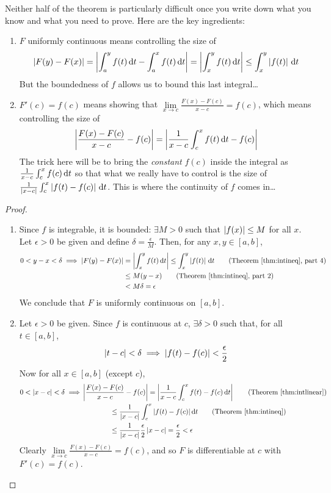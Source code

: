  Neither half of the theorem is particularly difficult once you write down what you know and what you need to prove. Here are the key ingredients:
\begin{enumerate}
  \item $F$ uniformly continuous means controlling the size of
  \[\left| F(y)-F(x)\right|=\left| \int_a^yf(t)\,{\mathrm{d} t}-\int_a^xf(t)\,{\mathrm{d} t}\right|=\left| \int_x^yf(t)\,{\mathrm{d} t}\right|\le \int_x^y\left| f(t)\right|\,{\mathrm{d} t}\]
  But the boundedness of $f$ allows us to bound this last integral\ldots
  \item $F'(c)=f(c)$ means showing that $\lim\limits_{x\to c}\frac{F(x)-F(c)}{x-c}=f(c)$, which means controlling the size of
  \[\left| \frac{F(x)-F(c)}{x-c}-f(c)\right| =\left| \frac 1{x-c}\int_{c}^xf(t)\,{\mathrm{d} t}-f(c)\right|\]
  The trick here will be to bring the \emph{constant} $f(c)$ inside the integral as $\frac 1{x-c}\int_c^xf(c)\,{\mathrm{d} t}$ so that what we really have to control is the size of $\frac 1{\left| x-c\right|}\int_c^x\left| f(t)-f(c)\right|\,{\mathrm{d} t}$. This is where the continuity of $f$ comes in\ldots
\end{enumerate}

\begin{proof}%
\begin{enumerate}
  \item Since $f$ is integrable, it is bounded: $\exists M>0$ such that $\left| f(x)\right|\le M$ for all $x$.\smallbreak
	Let $\epsilon>0$ be given and define $\delta=\frac{\epsilon}M$. Then, for any $x,y\in[a,b]$,
	\begin{align*}
		0<y-x<\delta \implies \nm{F(y)-F(x)}&=\nm{\int_x^yf(t)\,\dt}\le \int_x^y\nm{f(t)}\,\dt \tag{Theorem \ref{thm:intineq}, part 4}\\
		&\le M(y-x) \tag{Theorem \ref{thm:intineq}, part 2}\\
		&<M\delta=\epsilon
	\end{align*}
	We conclude that $F$ is uniformly continuous on $[a,b]$.
	\item Let $\epsilon>0$ be given. Since $f$ is continuous at $c$, $\exists\delta>0$ such that, for all $t\in[a,b]$,
	\[\left| t-c\right|<\delta \implies \left| f(t)-f(c)\right|<\frac\epsilon 2\]
	Now for all $x\in[a,b]$ (except $c$),
	\begin{align*}
		0<\nm{x-c}<\delta\implies 
		&\nm{\frac{F(x)-F(c)}{x-c}-f(c)} =\nm{\frac 1{x-c}\int_{c}^xf(t)-f(c)\,\dt} \tag{Theorem \ref{thm:intlinear}}\\
		&\qquad\qquad\le\frac 1{\nm{x-c}}\int_{c}^x\nm{f(t)-f(c)}\dt \tag{Theorem \ref{thm:intineq}}\\
		&\qquad\qquad\le\frac 1{\nm{x-c}}\frac\epsilon 2\nm{x-c}=\frac\epsilon 2<\epsilon
	\end{align*}
	Clearly $\lim\limits_{x\to c}\frac{F(x)-F(c)}{x-c}=f(c)$, and so $F$ is differentiable at $c$ with $F'(c)=f(c)$.\qedhere
\end{enumerate}
\end{proof}

